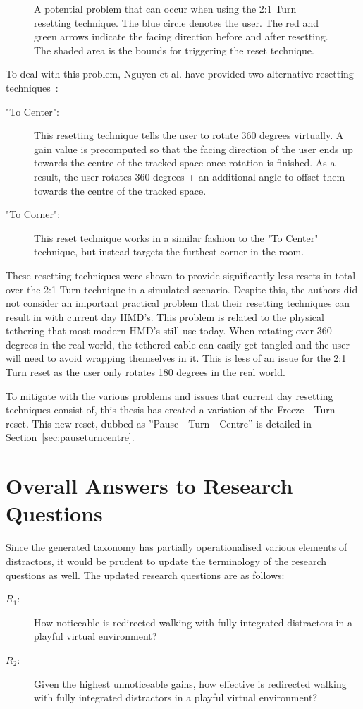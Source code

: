 \begin{figure}[htbp]
  \centering
  
  \caption[Potential Problem With 2:1 Turn Resetting]{A potential problem that can occur when using the 2:1 Turn resetting technique. The blue circle denotes the user. The red and green arrows indicate the facing direction before and after resetting. The shaded area is the bounds for triggering the reset technique.}
  \label{fig:2to1turnProblem}
\end{figure}

To deal with this problem, Nguyen et al. have provided two alternative resetting techniques~\cite{nguyen2018discrete}:

\begin{description}
   \item["To Center": ] This resetting technique tells the user to rotate 360 degrees virtually. A gain value is precomputed so that the facing direction of the user ends up towards the centre of the tracked space once rotation is finished. As a result, the user rotates 360 degrees + an additional angle to offset them towards the centre of the tracked space.
   \item["To Corner": ] This reset technique works in a similar fashion to the "To Center" technique, but instead targets the furthest corner in the room. 
\end{description}

These resetting techniques were shown to provide significantly less resets in total over the 2:1 Turn technique in a simulated scenario. Despite this, the authors did not consider an important practical problem that their resetting techniques can result in with current day HMD's. This problem is related to the physical tethering that most modern HMD's still use today. When rotating over 360 degrees in the real world, the tethered cable can easily get tangled and the user will need to avoid wrapping themselves in it. This is less of an issue for the 2:1 Turn reset as the user only rotates 180 degrees in the real world. 

To mitigate with the various problems and issues that current day resetting techniques consist of, this thesis has created a variation of the Freeze - Turn reset. This new reset, dubbed as ''Pause - Turn - Centre'' is detailed in Section~\ref{sec:pauseturncentre}.

\section{Overall Answers to Research Questions}
Since the generated taxonomy has partially operationalised various elements of distractors, it would be prudent to update the terminology of the research questions as well. 
The updated research questions are as follows: 
\begin{description}
   \item[$R_1$: ] How noticeable is redirected walking with fully integrated distractors in a playful virtual environment?
   \item[$R_2$: ] Given the highest unnoticeable gains, how effective is redirected walking with fully integrated distractors in a playful virtual environment?
\end{description}

